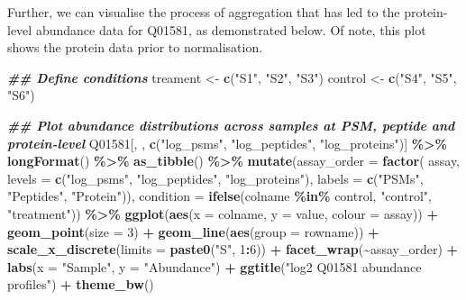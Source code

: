 \documentclass[9pt,a4paper,]{extarticle}
\newenvironment{Shaded}{\begin{snugshade}}{\end{snugshade}}
\newcommand{\AttributeTok}[1]{\textcolor[rgb]{0.13,0.29,0.53}{#1}}
\newcommand{\DecValTok}[1]{\textcolor[rgb]{0.00,0.00,0.81}{#1}}
\newcommand{\DocumentationTok}[1]{\textcolor[rgb]{0.56,0.35,0.01}{\textbf{\textit{#1}}}}
\newcommand{\FunctionTok}[1]{\textcolor[rgb]{0.13,0.29,0.53}{\textbf{#1}}}
\newcommand{\NormalTok}[1]{#1}
\newcommand{\OtherTok}[1]{\textcolor[rgb]{0.56,0.35,0.01}{#1}}
\newcommand{\SpecialCharTok}[1]{\textcolor[rgb]{0.81,0.36,0.00}{\textbf{#1}}}
\newcommand{\StringTok}[1]{\textcolor[rgb]{0.31,0.60,0.02}{#1}}
\begin{document}
Further, we can visualise the process of aggregation that has led to the protein-level
abundance data for Q01581, as demonstrated below. Of note, this plot shows
the protein data prior to normalisation.

\begin{Shaded}
\begin{Highlighting}[]
\DocumentationTok{\#\# Define conditions}
\NormalTok{treament }\OtherTok{\textless{}{-}} \FunctionTok{c}\NormalTok{(}\StringTok{"S1"}\NormalTok{, }\StringTok{"S2"}\NormalTok{, }\StringTok{"S3"}\NormalTok{)}
\NormalTok{control }\OtherTok{\textless{}{-}} \FunctionTok{c}\NormalTok{(}\StringTok{"S4"}\NormalTok{, }\StringTok{"S5"}\NormalTok{, }\StringTok{"S6"}\NormalTok{)}

\DocumentationTok{\#\# Plot abundance distributions across samples at PSM, peptide and protein{-}level}
\NormalTok{Q01581[, , }\FunctionTok{c}\NormalTok{(}\StringTok{"log\_psms"}\NormalTok{, }\StringTok{"log\_peptides"}\NormalTok{, }\StringTok{"log\_proteins"}\NormalTok{)] }\SpecialCharTok{\%\textgreater{}\%}
  \FunctionTok{longFormat}\NormalTok{() }\SpecialCharTok{\%\textgreater{}\%}
  \FunctionTok{as\_tibble}\NormalTok{() }\SpecialCharTok{\%\textgreater{}\%}
  \FunctionTok{mutate}\NormalTok{(}\AttributeTok{assay\_order =} \FunctionTok{factor}\NormalTok{(}
\NormalTok{    assay,}
    \AttributeTok{levels =} \FunctionTok{c}\NormalTok{(}\StringTok{"log\_psms"}\NormalTok{, }\StringTok{"log\_peptides"}\NormalTok{, }\StringTok{"log\_proteins"}\NormalTok{),}
    \AttributeTok{labels =} \FunctionTok{c}\NormalTok{(}\StringTok{"PSMs"}\NormalTok{, }\StringTok{"Peptides"}\NormalTok{, }\StringTok{"Protein"}\NormalTok{)),}
    \AttributeTok{condition =} \FunctionTok{ifelse}\NormalTok{(colname }\SpecialCharTok{\%in\%}\NormalTok{ control, }\StringTok{"control"}\NormalTok{, }\StringTok{"treatment"}\NormalTok{)) }\SpecialCharTok{\%\textgreater{}\%}
  \FunctionTok{ggplot}\NormalTok{(}\FunctionTok{aes}\NormalTok{(}\AttributeTok{x =}\NormalTok{ colname, }\AttributeTok{y =}\NormalTok{ value, }\AttributeTok{colour =}\NormalTok{ assay)) }\SpecialCharTok{+}
  \FunctionTok{geom\_point}\NormalTok{(}\AttributeTok{size =} \DecValTok{3}\NormalTok{) }\SpecialCharTok{+}
  \FunctionTok{geom\_line}\NormalTok{(}\FunctionTok{aes}\NormalTok{(}\AttributeTok{group =}\NormalTok{ rowname)) }\SpecialCharTok{+}
  \FunctionTok{scale\_x\_discrete}\NormalTok{(}\AttributeTok{limits =} \FunctionTok{paste0}\NormalTok{(}\StringTok{"S"}\NormalTok{, }\DecValTok{1}\SpecialCharTok{:}\DecValTok{6}\NormalTok{)) }\SpecialCharTok{+}
  \FunctionTok{facet\_wrap}\NormalTok{(}\SpecialCharTok{\textasciitilde{}}\NormalTok{assay\_order) }\SpecialCharTok{+}
  \FunctionTok{labs}\NormalTok{(}\AttributeTok{x =} \StringTok{"Sample"}\NormalTok{, }\AttributeTok{y =} \StringTok{"Abundance"}\NormalTok{) }\SpecialCharTok{+}
  \FunctionTok{ggtitle}\NormalTok{(}\StringTok{"log2 Q01581 abundance profiles"}\NormalTok{) }\SpecialCharTok{+}
  \FunctionTok{theme\_bw}\NormalTok{()}
\end{Highlighting}
\end{Shaded}
\end{document}
